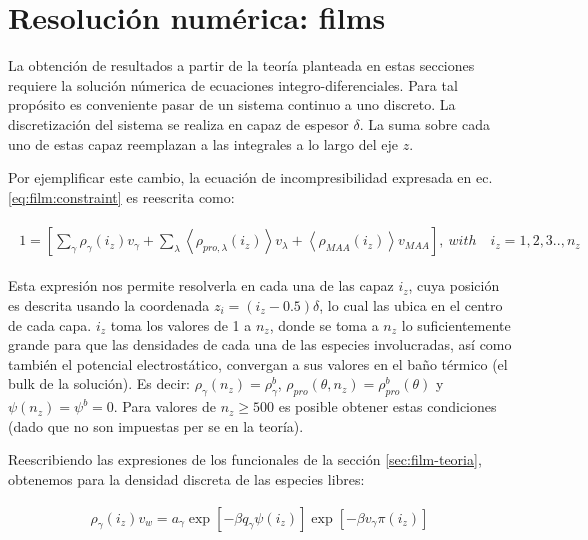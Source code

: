 


\section{Resoluci\'on num\'erica: films}\label{sec:film:reso-numerica}

La obtenci\'on de resultados a partir de la teor\'ia planteada en estas secciones requiere la soluci\'on n\'umerica de ecuaciones integro-diferenciales. Para tal prop\'osito es conveniente pasar de un sistema continuo a uno discreto. 
La discretizaci\'on del sistema se realiza en capaz de espesor $\delta$. La suma sobre cada uno de estas capaz reemplazan a las integrales a lo largo del eje $z$.

Por ejemplificar este cambio, la ecuaci\'on de incompresibilidad expresada en ec. \ref{eq:film:constraint} es reescrita como:


\begin{align}
	\begin{aligned}
		1=  {\left[\sum_{\gamma}\rho_\gamma(i_z) v_\gamma + \sum_\lambda{\left<\rho_{pro,\lambda}(i_z)\right>v_\lambda} + \left<\rho_{MAA}(i_z)\right>v_{MAA} \right]},~ with \quad  i_z =1,2,3.., n_z
	\end{aligned}
	\label{eq:film:discreto-constraint}
\end{align}

Esta expresi\'on nos permite resolverla en cada una de las capaz $i_z$, cuya posición es descrita usando la coordenada $z_i = (i_z -0.5)\delta$, lo cual las ubica en el centro de cada capa. $i_z$ toma los valores de 1 a $n_z$, donde se toma a $n_z$ lo suficientemente grande para que las densidades de cada una de las especies involucradas, as\'i como tambi\'en el potencial electrost\'atico, convergan a sus valores en el ba\~no t\'ermico (el bulk de la soluci\'on).
Es decir: $\rho_\gamma(n_z) = \rho^b_\gamma$, $\rho_{pro}(\theta,n_z) = \rho^b_{pro}(\theta)$ y $\psi(n_z) = \psi^b =0$.
Para valores de $n_z \geq 500$ es posible obtener estas condiciones (dado que no son impuestas per se en la teor\'ia).

Reescribiendo las expresiones de los funcionales de la secci\'on \ref{sec:film-teoria}, obtenemos para la densidad discreta de las especies libres:

\begin{align}
	\rho_\gamma(i_z)v_w = a_\gamma \exp\left[-\beta q_\gamma\psi(i_z)\right] \exp\left[-\beta v_\gamma\pi(i_z)\right]
\end{align}


